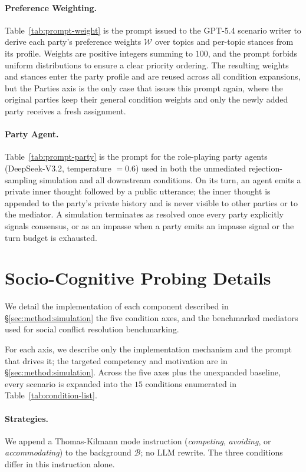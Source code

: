 \paragraph{Preference Weighting.}
Table~\ref{tab:prompt-weight} is the prompt issued to the GPT-5.4 scenario writer to derive each party's preference weights $\mathcal{W}$ over topics and per-topic stances from its profile. Weights are positive integers summing to $100$, and the prompt forbids uniform distributions to ensure a clear priority ordering. The resulting weights and stances enter the party profile and are reused across all condition expansions, but the Parties axis is the only case that issues this prompt again, where the original parties keep their general condition weights and only the newly added party receives a fresh assignment.

\paragraph{Party Agent.}
Table~\ref{tab:prompt-party} is the prompt for the role-playing party agents (DeepSeek-V3.2, temperature $=0.6$) used in both the unmediated rejection-sampling simulation and all downstream conditions. On its turn, an agent emits a private inner thought followed by a public utterance; the inner thought is appended to the party's private history and is never visible to other parties or to the mediator. A simulation terminates as resolved once every party explicitly signals consensus, or as an impasse when a party emits an impasse signal or the turn budget is exhausted.


\section{Socio-Cognitive Probing Details}
\label{app:probing}

We detail the implementation of each component described in \S\ref{sec:method:simulation} the five condition axes, and the benchmarked mediators used for social conflict resolution benchmarking.


For each axis, we describe only the implementation mechanism and the prompt that drives it; the targeted competency and motivation are in \S\ref{sec:method:simulation}. Across the five axes plus the unexpanded baseline, every scenario is expanded into the $15$ conditions enumerated in Table~\ref{tab:condition-list}.

\paragraph{Strategies.}
We append a Thomas-Kilmann mode instruction (\emph{competing}, \emph{avoiding}, or \emph{accommodating}) to the background $\mathcal{B}$; no LLM rewrite. The three conditions differ in this instruction alone.

